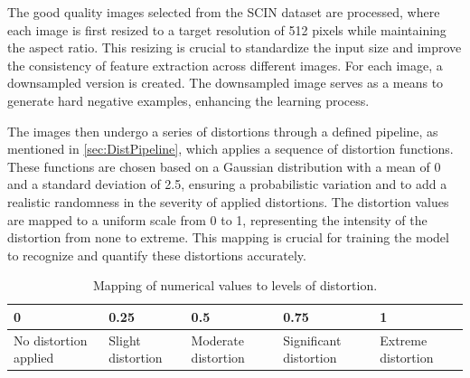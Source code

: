 The good quality images selected from the SCIN \autocite{SCIN} dataset are processed, where each image is first resized to a target resolution of 512 pixels while maintaining the aspect ratio. This resizing is crucial to standardize the input size and improve the consistency of feature extraction across different images. For each image, a downsampled version is created. The downsampled image serves as a means to generate hard negative examples, enhancing the learning process. \par
\vspace{\baselineskip}
\noindent
The images then undergo a series of distortions through a defined pipeline, as mentioned in \autoref{sec:DistPipeline}, which applies a sequence of distortion functions. These functions are chosen based on a Gaussian distribution with a mean of 0 and a standard deviation of 2.5, ensuring a probabilistic variation and to add a realistic randomness in the severity of applied distortions. The distortion values are mapped to a uniform scale from 0 to 1, representing the intensity of the distortion from none to extreme. This mapping is crucial for training the model to recognize and quantify these distortions accurately. \par
\begin{table}[h]
    \centering
    \begin{tabularx}{\textwidth}{|X|X|X|X|X|}
        \hline
        \textbf{0} & \textbf{0.25} & \textbf{0.5} & \textbf{0.75} & \textbf{1} \\ \hline
        No distortion applied & Slight distortion & Moderate distortion & Significant distortion & Extreme distortion \\ \hline
    \end{tabularx}
    \caption{Mapping of numerical values to levels of distortion.}
    \label{tab:a}
\end{table}

